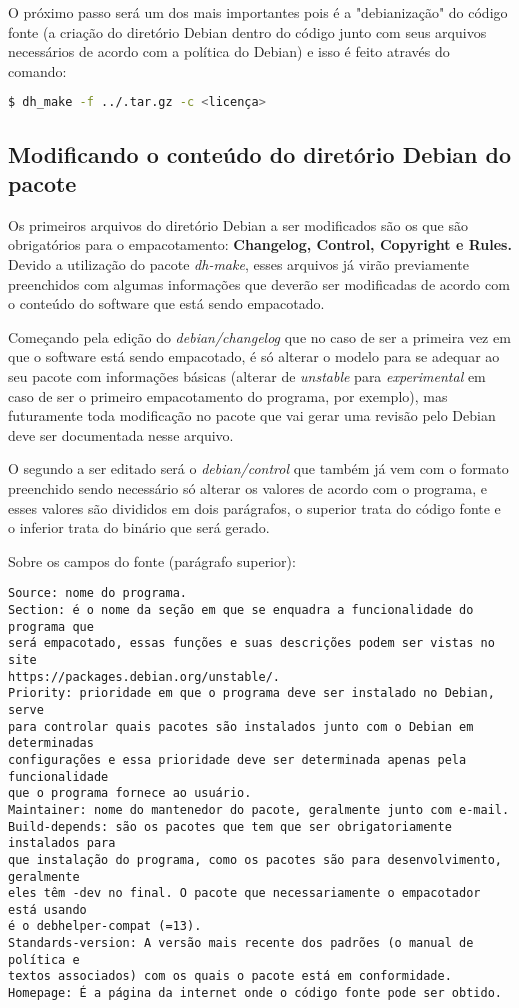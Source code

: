 O próximo passo será um dos mais importantes pois é a "debianização" do código fonte (a criação do diretório Debian dentro do código junto com seus arquivos necessários de acordo com a política do Debian) e isso é feito através do comando:

\begin{lstlisting}[language=bash]
	$ dh_make -f ../.tar.gz -c <licença> 
\end{lstlisting} 

\subsection{Modificando o conteúdo do diretório Debian do pacote}

Os primeiros arquivos do diretório Debian a ser modificados são os que são obrigatórios para o empacotamento:\textbf{ Changelog, Control, Copyright e Rules.} Devido a utilização do pacote \textit{dh-make}, esses arquivos já virão previamente preenchidos com algumas informações que deverão ser modificadas de acordo com o conteúdo do software que está sendo empacotado.

Começando pela edição do \textit{debian/changelog} que no caso de ser a primeira vez em que o software está sendo empacotado, é só alterar o modelo para se adequar ao seu pacote com informações básicas (alterar de \textit{unstable} para \textit{experimental} em caso de ser o primeiro empacotamento do programa, por exemplo), mas futuramente toda modificação no pacote que vai gerar uma revisão pelo Debian deve ser documentada nesse arquivo. 

O segundo a ser editado será o \textit{debian/control} que também já vem com o formato preenchido sendo necessário só alterar os valores de acordo com o programa, e esses valores são divididos em dois parágrafos, o superior trata do código fonte e o inferior trata do binário que será gerado.

Sobre os campos do fonte (parágrafo superior):
\begin{verbatim}
Source: nome do programa.
Section: é o nome da seção em que se enquadra a funcionalidade do programa que
será empacotado, essas funções e suas descrições podem ser vistas no site 
https://packages.debian.org/unstable/.
Priority: prioridade em que o programa deve ser instalado no Debian, serve
para controlar quais pacotes são instalados junto com o Debian em determinadas 
configurações e essa prioridade deve ser determinada apenas pela funcionalidade
que o programa fornece ao usuário.
Maintainer: nome do mantenedor do pacote, geralmente junto com e-mail.
Build-depends: são os pacotes que tem que ser obrigatoriamente instalados para
que instalação do programa, como os pacotes são para desenvolvimento, geralmente
eles têm -dev no final. O pacote que necessariamente o empacotador está usando
é o debhelper-compat (=13).
Standards-version: A versão mais recente dos padrões (o manual de política e
textos associados) com os quais o pacote está em conformidade. 
Homepage: É a página da internet onde o código fonte pode ser obtido.
\end{verbatim}

